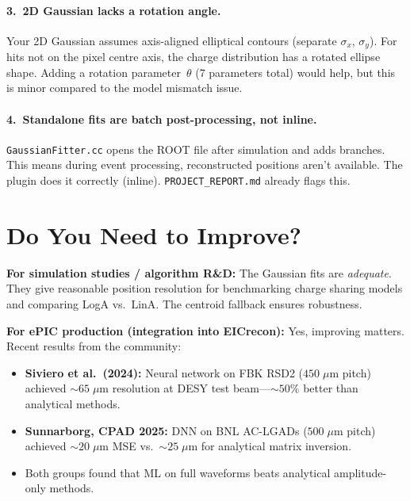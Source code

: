 \documentclass[11pt,a4paper]{article}
\newcommand{\file}[1]{\texttt{#1}}
\begin{document}
\paragraph{3.\ 2D Gaussian lacks a rotation angle.}
Your 2D Gaussian assumes axis-aligned elliptical contours (separate
$\sigma_x$, $\sigma_y$).  For hits not on the pixel centre axis, the
charge distribution has a rotated ellipse shape.  Adding a rotation
parameter~$\theta$ (7 parameters total) would help, but this is minor
compared to the model mismatch issue.

\paragraph{4.\ Standalone fits are batch post-processing, not inline.}
\file{GaussianFitter.cc} opens the ROOT file after simulation and adds
branches.  This means during event processing, reconstructed positions
aren't available.  The plugin does it correctly (inline).
\file{PROJECT\_REPORT.md} already flags this.

\section{Do You Need to Improve?}

\textbf{For simulation studies / algorithm R\&D:}\quad
The Gaussian fits are \emph{adequate}.  They give reasonable position
resolution for benchmarking charge sharing models and comparing LogA
vs.\ LinA.  The centroid fallback ensures robustness.

\medskip\noindent
\textbf{For ePIC production (integration into EICrecon):}\quad
Yes, improving matters.  Recent results from the community:

\begin{itemize}[nosep]
  \item \textbf{Siviero et al.\ (2024):} Neural network on FBK RSD2
    ($450\;\mu\text{m}$ pitch) achieved ${\sim}65\;\mu\text{m}$ resolution
    at DESY test beam---${\sim}50\%$ better than analytical methods.
  \item \textbf{Sunnarborg, CPAD 2025:} DNN on BNL AC-LGADs
    ($500\;\mu\text{m}$ pitch) achieved ${\sim}20\;\mu\text{m}$ MSE
    vs.\ ${\sim}25\;\mu\text{m}$ for analytical matrix inversion.
  \item Both groups found that ML on full waveforms beats analytical
    amplitude-only methods.
\end{itemize}
\end{document}

